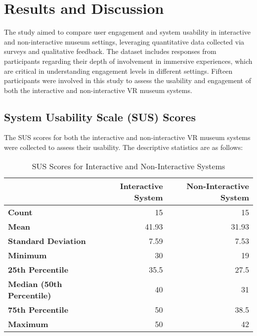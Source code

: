 \documentclass[conference]{IEEEtran}
\begin{document}
\section{Results and Discussion}

The study aimed to compare user engagement and system usability in interactive and non-interactive museum settings, leveraging quantitative data collected via surveys and qualitative feedback. The dataset includes responses from participants regarding their depth of involvement in immersive experiences, which are critical in understanding engagement levels in different settings. Fifteen participants were involved in this study to assess the usability and engagement of both the interactive and non-interactive VR museum systems.

\subsection{System Usability Scale (SUS) Scores}
The SUS scores for both the interactive and non-interactive VR museum systems were collected to assess their usability. The descriptive statistics are as follows:
\begin{table}[h]
    \centering
    \begin{tabular}{|l|r|r|}
    \hline
                             & \textbf{Interactive System} & \textbf{Non-Interactive System} \\ \hline
    \textbf{Count}           & 15                          & 15                              \\ \hline
    \textbf{Mean}            & 41.93                       & 31.93                           \\ \hline
    \textbf{Standard Deviation} & 7.59                       & 7.53                            \\ \hline
    \textbf{Minimum}         & 30                          & 19                              \\ \hline
    \textbf{25th Percentile} & 35.5                        & 27.5                            \\ \hline
    \textbf{Median (50th Percentile)} & 40                 & 31                              \\ \hline
    \textbf{75th Percentile} & 50                          & 38.5                            \\ \hline
    \textbf{Maximum}         & 50                          & 42                              \\ \hline
    \end{tabular}
    \caption{SUS Scores for Interactive and Non-Interactive Systems}
\end{table}
\end{document}
